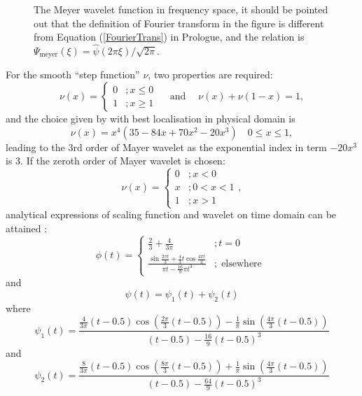 \documentclass{book}
\newcommand{\mathpi}{\pi}
\newcommand{\tmop}[1]{\ensuremath{\operatorname{#1}}}
\begin{document}
\begin{figure}[h]
  \caption{\label{fig:MeyerWaveletSpectrum}The Meyer wavelet function in
  frequency space, it should be pointed out that the definition of Fourier
  transform in the figure is different from Equation (\ref{FourierTrans}) in
  Prologue, and the relation is $\Psi_{\tmop{meyer}} (\xi) = \hat{\psi} (2 \pi
  \xi) / \sqrt{2 \mathpi}$.}
\end{figure}

For the smooth ``step function'' $\nu$, two properties are required:
\[ \nu (x) = \left\{ \begin{array}{ll}
     0 & ; x \leqslant 0\\
     1 & ; x \geqslant 1
   \end{array} \right. \quad \tmop{and} \quad \nu (x) + \nu (1 - x) = 1, \]
and the choice given by {\cite{daubechies1992ten}} with best localisation in
physical domain is
\[ \nu (x) = x^4 (35 - 84 x + 70 x^2 - 20 x^3) \quad 0 \leqslant x \leqslant
   1, \]
leading to the 3rd order of Mayer wavelet as the exponential index in term $-
20 x^3$ is $3$. If the zeroth order of Mayer wavelet is chosen:
\[ \nu (x) = \left\{ \begin{array}{ll}
     0 & ; x < 0\\
     x & ; 0 < x < 1\\
     1 & ; x > 1
   \end{array} \right., \]
analytical expressions of scaling function and wavelet on time domain can be
attained {\cite{vermehren2015close}}:
\[ \phi (t) = \left\{ \begin{array}{ll}
     \frac{2}{3} + \frac{4}{3 \mathpi} & ; t = 0\\
     \frac{\sin \frac{2 \mathpi t}{3} + \frac{4}{3} t \cos \frac{4 \mathpi
     t}{3}}{\mathpi t - \frac{16}{9} \mathpi t^3} & ; \tmop{elsewhere}
   \end{array} \right. \]
and
\[ \psi (t) = \psi_1 (t) + \psi_2 (t) \]
where
\[ \psi_1 (t) = \frac{\frac{4}{3 \mathpi} (t - 0.5) \cos \left( \frac{2
   \mathpi}{3} (t - 0.5) \right) - \frac{1}{\mathpi} \sin \left( \frac{4
   \mathpi}{3} (t - 0.5) \right)}{(t - 0.5) - \frac{16}{9} (t - 0.5)^3} \]
and
\[ \psi_2 (t) = \frac{\frac{8}{3 \mathpi} (t - 0.5) \cos \left( \frac{8
   \mathpi}{3} (t - 0.5) \right) + \frac{1}{\mathpi} \sin \left( \frac{4
   \mathpi}{3} (t - 0.5) \right)}{(t - 0.5) - \frac{64}{9} (t - 0.5)^3} \]
\end{document}
